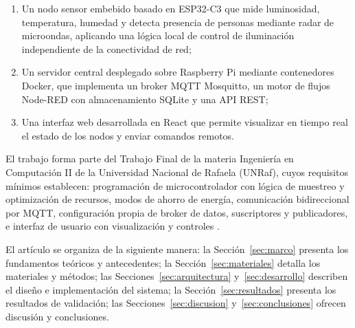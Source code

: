 \begin{enumerate}[label=(\roman*)]
  \item Un nodo sensor embebido basado en ESP32-C3 que mide luminosidad,
        temperatura, humedad y detecta presencia de personas mediante radar
        de microondas, aplicando una lógica local de control de iluminación
        independiente de la conectividad de red;
  \item Un servidor central desplegado sobre Raspberry Pi mediante contenedores
        Docker, que implementa un broker MQTT Mosquitto, un motor de flujos
        Node-RED con almacenamiento SQLite y una API REST;
  \item Una interfaz web desarrollada en React que permite visualizar en tiempo
        real el estado de los nodos y enviar comandos remotos.
\end{enumerate}

El trabajo forma parte del Trabajo Final de la materia Ingeniería en Computación II
de la Universidad Nacional de Rafaela (UNRaf), cuyos requisitos mínimos establecen: programación de microcontrolador con
lógica de muestreo y optimización de recursos, modos de ahorro de energía,
comunicación bidireccional por MQTT, configuración propia de broker de datos,
suscriptores y publicadores, e interfaz de usuario con visualización y controles
\parencite{CatedraICII2026}.

El artículo se organiza de la siguiente manera: la Sección~\ref{sec:marco} presenta
los fundamentos teóricos y antecedentes; la Sección~\ref{sec:materiales} detalla los
materiales y métodos; las Secciones~\ref{sec:arquitectura}
y~\ref{sec:desarrollo} describen el diseño e implementación del sistema; la
Sección~\ref{sec:resultados} presenta los resultados de validación; las
Secciones~\ref{sec:discusion} y~\ref{sec:conclusiones} ofrecen discusión y
conclusiones.

